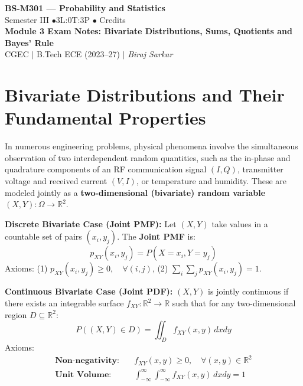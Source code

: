\documentclass[12pt,a4paper]{article}
\begin{document}
\begin{center}
  {\LARGE\bfseries\color{myred} BS-M301 --- Probability and Statistics}\\[5pt]
  {\normalsize\color{mydark} Semester III \quad$\bullet$\quad 3L:0T:3P \quad$\bullet$ Credits}\\[3pt]
  {\normalsize\color{myteal}\textbf{Module 3 Exam Notes: Bivariate Distributions, Sums, Quotients and Bayes' Rule}}\\[3pt]
  {\small\color{mydark} CGEC \;$|$\; B.Tech ECE (2023--27) \;$|$\; \textit{Biraj Sarkar}}
\end{center}
\vspace{2pt}
\noindent{\color{myred}\rule{\linewidth}{1.5pt}}
\vspace{2pt}

\hypersetup{linkcolor=mydark}
\tableofcontents
\hypersetup{linkcolor=myteal}
\newpage

\section{Bivariate Distributions and Their Fundamental Properties}

In numerous engineering problems, physical phenomena involve the simultaneous observation of two interdependent random quantities, such as the in-phase and quadrature components of an RF communication signal $(I, Q)$, transmitter voltage and received current $(V, I)$, or temperature and humidity. These are modeled jointly as a \textbf{two-dimensional (bivariate) random variable} $(X, Y): \Omega \to \mathbb{R}^2$.

\begin{tcolorbox}[defbox, title={\textbf{Definition: Joint Probability Mass and Density Functions}}]
\textbf{Discrete Bivariate Case (Joint PMF):}
Let $(X, Y)$ take values in a countable set of pairs $(x_i, y_j)$. The \textbf{Joint PMF} is:
\begin{equation}
  p_{XY}(x_i, y_j) = P(X = x_i, Y = y_j)
\end{equation}
Axioms: (1) $p_{XY}(x_i, y_j) \ge 0, \quad \forall (i, j)$, \quad (2) $\displaystyle\sum_{i} \sum_{j} p_{XY}(x_i, y_j) = 1$.

\textbf{Continuous Bivariate Case (Joint PDF):}
$(X, Y)$ is jointly continuous if there exists an integrable surface $f_{XY}: \mathbb{R}^2 \to \mathbb{R}$ such that for any two-dimensional region $D \subseteq \mathbb{R}^2$:
\begin{equation}
  P((X, Y) \in D) = \iint_D f_{XY}(x, y) \, dx dy
\end{equation}
Axioms:
\begin{align}
  \textbf{Non-negativity:} \quad & f_{XY}(x, y) \ge 0, \quad \forall (x, y) \in \mathbb{R}^2 \\[4pt]
  \textbf{Unit Volume:} \quad & \int_{-\infty}^\infty \int_{-\infty}^\infty f_{XY}(x, y) \, dx dy = 1
\end{align}
\end{tcolorbox}
\end{document}
